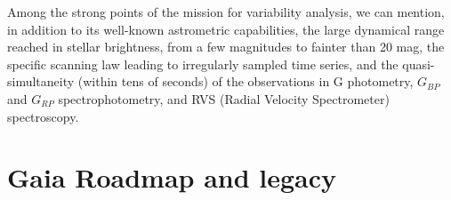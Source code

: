 Among the strong points of the mission for variability analysis, we can mention, in addition to its well-known astrometric
capabilities, the large dynamical range reached in stellar brightness, from a few magnitudes to fainter than 20 mag, the specific scanning law leading to irregularly sampled time series,
and the quasi-simultaneity (within tens of seconds) of the observations in G photometry, $G_{BP}$ and $G_{RP}$ spectrophotometry, and
RVS (Radial Velocity Spectrometer) spectroscopy.





\begin{comment}
filtered magnitude time series in G FoV (i.e. averaging the G CCD
measurements within one FoV transit), G BP , and G RP as
described in Eyer et al. (2017) and in Holl et al. (2018)
\end{comment}



\section{Gaia Roadmap and legacy}



